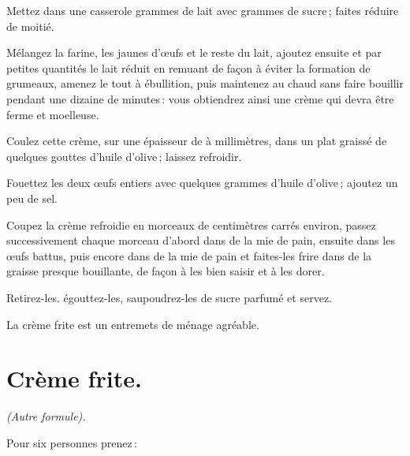 Mettez dans une casserole {\mmm} grammes de lait avec {\mmm}
grammes de sucre ; faites réduire de moitié.

Mélangez la farine, les jaunes d'œufs et le reste du lait, ajoutez ensuite et
par petites quantités le lait réduit en remuant de façon à éviter la formation
de grumeaux, amenez le tout à ébullition, puis maintenez au chaud sans faire
bouillir pendant une dizaine de minutes : vous obtiendrez ainsi une crème qui
devra être ferme et moelleuse.

Coulez cette crème, sur une épaisseur de {\mmm} à {\mmm} millimètres,
dans un plat graissé de quelques gouttes d'huile d'olive ; laissez refroidir.

Fouettez les deux œufs entiers avec quelques grammes d'huile d'olive ; ajoutez
un peu de sel.

Coupez la crème refroidie en morceaux de {\mmm} centimètres carrés
environ, passez successivement chaque morceau d’abord dans de la mie de pain,
ensuite dans les œufs battus, puis encore dans de la mie de pain et faites-les
frire dans de la graisse presque bouillante, de façon à les bien saisir et
à les dorer.

Retirez-les. égouttez-les, saupoudrez-les de sucre parfumé et servez.

La crème frite est un entremets de ménage agréable.

\section*{\centering Crème frite.}
{}

\begin{center}
\textit{(Autre formule).}
\end{center}

Pour six personnes prenez :

